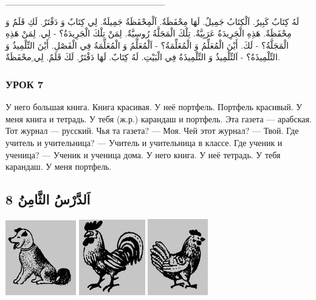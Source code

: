 \documentclass[a5paper]{article}
\begin{document}
\_\_\_\_\_\_\_\_\_\_\_\_\_\_\_\_\_\_\_\_\_\_\_\_\_

لَهُ كِتَابٌ كَبِيرٌ. اَلْكِتَابُ جَمِيلٌ. لَهَا مِحْفَظَةٌ. اَلْمِحْفَظَةُ جَمِيلَةٌ. لِي كِتَابٌ وَ دَفْتَرٌ. لَكِ قَلَمٌ وَ مِحْفَظَةٌ. هَذِهِ الْجَرِيدَةُ عَرَبِيَّةٌ. تِلْكَ الْمَجَلَّةُ رُوسِيَّةٌ. لِمَنْ تِلْكَ الْجَرِيدَةُ؟ - لِي. لِمَنْ هَذِهِ الْمَجَلَّةُ؟ - لَكَ. أَيْنَ الْمُعَلِّمُ وَ الْمُعَلِّمَةُ؟ - اَلْمُعَلِّمُ وَ الْمُعَلِّمَةُ فِي الْفَصْلِ. أَيْنَ التِّلْمِيذُ وَ التِّلْمِيذَةُ؟ - اَلتِّلْمِيذُ وَ التِّلْمِيذَةُ فِي الْبَيْتِ. لَهُ كِتَابٌ. لَهَا دَفْتَرٌ. لَكَ قَلَمٌ. لِي ِمحْفَظَةٌ.

\subsubsection{УРОК 7}
У него большая книга. Книга красивая. У неё портфель. Портфель красивый. У меня книга и тетрадь. У тебя (ж.р.) карандаш и портфель. Эта газета — арабская. Тот журнал — русский. Чья та газета? — Моя. Чей этот журнал? — Твой. Где учитель и учительница? — Учитель и учительница в классе. Где ученик и ученица? — Ученик и ученица дома. У него книга. У неё тетрадь. У тебя карандаш. У меня портфель.

\subsection{8 اَلدَّرْسُ الثَّامِنُ}
 \includegraphics[width=1.2083in,height=1.2811in]{images/MuhammadBagauddinprettified-img011.jpg}   \includegraphics[width=1.1354in,height=1.2917in]{images/MuhammadBagauddinprettified-img012.jpg}   \includegraphics[width=1.0311in,height=1.302in]{images/MuhammadBagauddinprettified-img013.jpg} 
\end{document}
